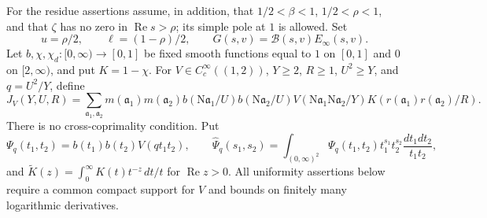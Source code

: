\documentclass[11pt]{article}
\numberwithin{equation}{section}
\newcommand{\B}{\mathcal B}
\newcommand{\N}{\mathrm N}
\newcommand{\Rea}{\operatorname{Re}}
\begin{document}
For the residue assertions assume, in addition, that
\(1/2<\beta<1\), \(1/2<\rho<1\), and that \(\zeta\) has no zero
in \(\Rea s>\rho\); its simple pole at \(1\) is allowed. Set
\[
 u=\rho/2,\qquad \ell=(1-\rho)/2,\qquad
 G(s,v)=\B(s,v)E_\infty(s,v).
\]
Let \(b,\chi,\chi_d:[0,\infty)\to[0,1]\) be fixed smooth
functions equal to \(1\) on \([0,1]\) and \(0\) on \([2,\infty)\),
and put \(K=1-\chi\). For \(V\in C_c^\infty((1,2))\),
\(Y\ge2\), \(R\ge1\), \(U^2\ge Y\), and \(q=U^2/Y\), define
\begin{equation}\label{res:tail-def}
 J_V(Y,U,R)=\sum_{\mathfrak a_1,\mathfrak a_2}
 m(\mathfrak a_1)m(\mathfrak a_2)
 b(\N\mathfrak a_1/U)b(\N\mathfrak a_2/U)
 V(\N\mathfrak a_1\N\mathfrak a_2/Y)
 K(r(\mathfrak a_1)r(\mathfrak a_2)/R).
\end{equation}
There is no cross-coprimality condition. Put
\[
 \Psi_q(t_1,t_2)=b(t_1)b(t_2)V(qt_1t_2),\qquad
 \widehat\Psi_q(s_1,s_2)=
 \int_{(0,\infty)^2}\Psi_q(t_1,t_2)t_1^{s_1}t_2^{s_2}
 \frac{dt_1dt_2}{t_1t_2},
\]
and \(\widetilde K(z)=\int_0^\infty K(t)t^{-z}\,dt/t\)
for \(\Rea z>0\).
All uniformity assertions below require a common compact support
for \(V\) and bounds on finitely many logarithmic derivatives.
\end{document}
